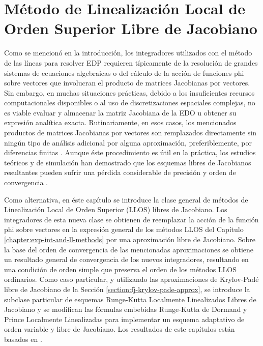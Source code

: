 \chapter{Método de Linealización Local de Orden Superior Libre de Jacobiano}\label{chapter:llrk-fj}


Como se mencionó en la introducción, los integradores utilizados con el método de las líneas para resolver EDP requieren típicamente de la resolución de grandes sistemas de ecuaciones algebraicas o del cálculo  de la acción de funciones phi sobre vectores que involucran el producto de matrices Jacobianas por vectores. Sin embargo, en muchas situaciones prácticas, debido a los insuficientes recursos computacionales disponibles o al uso de discretizaciones espaciales complejas, no es viable evaluar y almacenar la matriz Jacobiana de la EDO u obtener su expresión analítica exacta. Rutinariamente, en esos casos, los mencionados productos de matrices Jacobianas por vectores son remplazados directamente sin ningún tipo de análisis adicional por alguna aproximación, preferiblemente, por diferencias finitas \cite{steihaug1979attempt,schmitt1995matrix,weiner1997rowmap,hochbruck1998exponential,hosseini1999matrix,tranquilli2014rosenbrock}. Aunque éste procedimiento es útil en la práctica, los estudios teóricos y de simulación han demostrado que los esquemas libres de Jacobianos resultantes pueden sufrir una pérdida considerable de precisión y orden de convergencia \cite{wanner1996solving,hochbruck1998exponential,tranquilli2014rosenbrock}.

Como alternativa, en éste capítulo se introduce la clase general de métodos de Linealización Local de Orden Superior (LLOS) libres de Jacobiano. Los integradores de esta nueva clase se obtienen de reemplazar la acción de la función phi sobre vectores en la expresión general de los métodos LLOS del Capítulo \ref{chapter:exp-int-and-ll-methods} por una aproximación libre de Jacobiano. Sobre la base del orden de convergencia de las mencionadas aproximaciones se obtiene un resultado general de convergencia de los nuevos integradores, resultando en una condición de orden simple que preserva el orden de los métodos LLOS ordinarios. Como caso particular, y utilizando las aproximaciones de Krylov-Padé libre de Jacobiano de la Sección \ref{section:fj-krylov-pade-approx}, se introduce la subclase particular de esquemas Runge-Kutta Localmente Linealizados Libres de Jacobiano y se modifican las fórmulas embebidas Runge-Kutta de Dormand y Prince Localmente Linealizadas para implementar un esquema adaptativo de orden variable y libre de Jacobiano. Los resultados de este capítulos están basados en \cite{naranjo2022RT,naranjo2023jacobian}.

